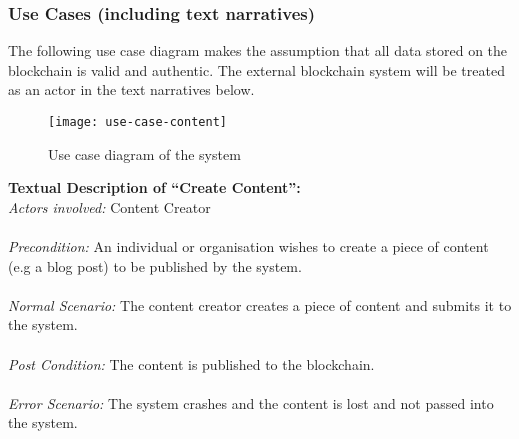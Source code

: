 \subsubsection{Use Cases (including text narratives)}
The following use case diagram makes the assumption that all data stored 
on the blockchain is valid and authentic. The external blockchain system will 
be treated as an actor in the text narratives below.

\begin{figure}[h]
\centering %
\texttt{[image: use-case-content]} %
\caption{Use case diagram of the system}
\label{fig: create-content} %
\end{figure}

\noindent
\textbf{Textual Description of “Create Content”:} \\
\textit{Actors involved:} Content Creator \\ \\
\textit{Precondition:} An individual or organisation wishes to create a piece of content 
					   (e.g a blog post) to be published by the system. \\ \\
\textit{Normal Scenario:} The content creator creates a piece of content and submits it to the system. \\ \\
\textit{Post Condition:} The content is published to the blockchain. \\ \\
\textit{Error Scenario:} The system crashes and the content is lost and not passed into the system. \\ \\

